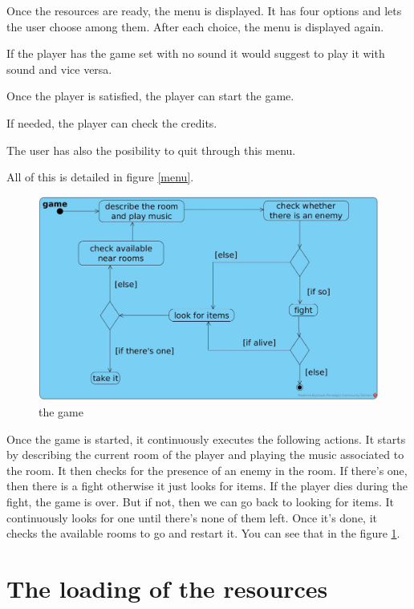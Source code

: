 \documentclass[11pt]{extarticle}
\begin{document}
Once the resources are ready, the menu is displayed. It has four options and lets the user choose among them. After each choice, the menu is displayed again.

If the player has the game set with no sound it would suggest to play it with sound and vice versa.

Once the player is satisfied, the player can start the game.

If needed, the player can check the credits.

The user has also the posibility to quit through this menu. 

All of this is detailed in figure \ref{menu}.

\begin{figure}
    \centering
    
    \caption{the game}
    \label{game}
    \includegraphics[scale = 0.32]{game}
\end{figure}

\vspace{\baselineskip}

Once the game is started, it continuously executes the following actions. It starts by describing the current room of the player and playing the music associated to the room. It then checks for the presence of an enemy in the room. If there's one, then there is a fight otherwise it just looks for items. If the player dies during the fight, the game is over. But if not, then we can go back to looking for items. It continuously looks for one until there's none of them left. Once it's done, it checks the available rooms to go and restart it. You can see that in the figure \ref{game}.

\section{The loading of the resources}
\end{document}

